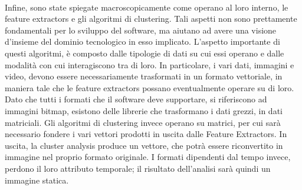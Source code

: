\\Infine, sono state spiegate macroscopicamente come operano al loro interno, le 
feature extractors\glossario{} e gli algoritmi di clustering\glossario{}. 
Tali aspetti non sono prettamente fondamentali per lo sviluppo del software, ma aiutano ad avere una visione 
d'insieme del dominio tecnologico in esso implicato. L'aspetto importante di questi algoritmi, è composto dalle 
tipologie di dati su cui essi operano e dalle modalità con cui interagiscono tra di loro. In particolare, i vari
dati, immagini e video, devono essere necessariamente trasformati in un formato vettoriale, in maniera tale
che le feature extractors\glossario{} possano eventualmente operare su di loro. Dato che tutti i formati che il software deve supportare, si riferiscono ad immagini bitmap\glossario{}, esistono delle librerie che trasformano i dati grezzi, in dati matriciali. Gli algoritmi di clustering\glossario{} invece operano su matrici, per cui sarà necessario fondere i vari vettori prodotti in
uscita dalle Feature Extractors\glossario{}. In uscita, la cluster analysis\glossario{} produce 
un vettore, che potrà essere riconvertito in immagine nel proprio formato originale. I formati dipendenti dal tempo invece, perdono il loro attributo temporale; il risultato dell'analisi sarà quindi un immagine statica.